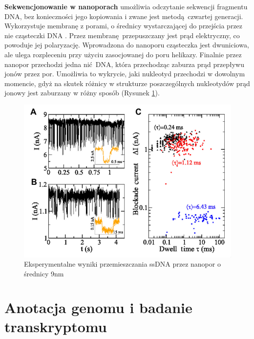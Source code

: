 \documentclass[two column, twoside, a4paper]{article}
\begin{document}
\textbf{Sekwencjonowanie w nanoporach} umożliwia odczytanie sekwencji fragmentu DNA, bez konieczności jego kopiowania i zwane jest metodą czwartej generacji. Wykorzystuje membranę z porami, o średnicy wystarczającej do przejścia przez nie cząsteczki DNA \autocite{Feng2015}. Przez membranę przepuszczany jest prąd elektryczny, co powoduje jej polaryzację. Wprowadzona do nanoporu cząsteczka jest dwuniciowa, ale ulega rozpleceniu przy użyciu zasocjowanej do poru helikazy. Finalnie przez nanopor przechodzi jedna nić DNA, która przechodząc zaburza prąd przepływu jonów przez por. Umożliwia to wykrycie, jaki nukleotyd przechodzi w dowolnym momencie, gdyż na skutek różnicy w strukturze poszczególnych nukleotydów prąd jonowy jest zaburzany w różny sposób (Rysunek \ref{fig::nanopore}). \autocite{Brown2019}

\begin{figure}[bt]
\begin{tcolorbox}
	\centering
	\includegraphics[width=\textwidth]{./figury/nanopore_experimental.png}
	\caption{Eksperymentalne wyniki przemieszczania ssDNA przez nanopor o średnicy 9nm \autocite{Feng2015}}\label{fig::nanopore}
\end{tcolorbox}
\end{figure}

\section{Anotacja genomu i badanie transkryptomu}
\end{document}
